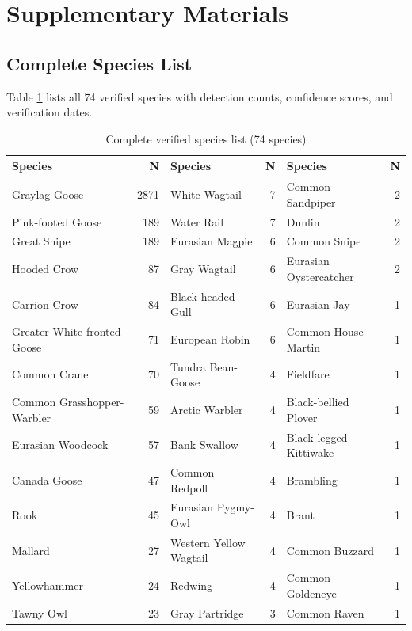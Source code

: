 \documentclass[twocolumn]{article}
\begin{document}

\newpage
\onecolumn

\appendix
\section{Supplementary Materials}

\subsection{Complete Species List}

Table \ref{tab:species_full} lists all 74 verified species with detection counts, confidence scores, and verification dates.

\begin{table}[H]
\centering
\caption{Complete verified species list (74 species)}
\label{tab:species_full}
\tiny
\begin{tabular}{lr|lr|lr}
\toprule
\textbf{Species} & \textbf{N} & \textbf{Species} & \textbf{N} & \textbf{Species} & \textbf{N} \\
\midrule
Graylag Goose & 2871 & White Wagtail & 7 & Common Sandpiper & 2 \\
Pink-footed Goose & 189 & Water Rail & 7 & Dunlin & 2 \\
Great Snipe & 189 & Eurasian Magpie & 6 & Common Snipe & 2 \\
Hooded Crow & 87 & Gray Wagtail & 6 & Eurasian Oystercatcher & 2 \\
Carrion Crow & 84 & Black-headed Gull & 6 & Eurasian Jay & 1 \\
Greater White-fronted Goose & 71 & European Robin & 6 & Common House-Martin & 1 \\
Common Crane & 70 & Tundra Bean-Goose & 4 & Fieldfare & 1 \\
Common Grasshopper-Warbler & 59 & Arctic Warbler & 4 & Black-bellied Plover & 1 \\
Eurasian Woodcock & 57 & Bank Swallow & 4 & Black-legged Kittiwake & 1 \\
Canada Goose & 47 & Common Redpoll & 4 & Brambling & 1 \\
Rook & 45 & Eurasian Pygmy-Owl & 4 & Brant & 1 \\
Mallard & 27 & Western Yellow Wagtail & 4 & Common Buzzard & 1 \\
Yellowhammer & 24 & Redwing & 4 & Common Goldeneye & 1 \\
Tawny Owl & 23 & Gray Partridge & 3 & Common Raven & 1 \\

\end{tabular}
\end{table}
\end{document}
